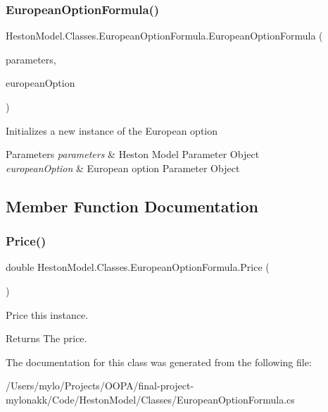 \subsubsection{\texorpdfstring{European\+Option\+Formula()}{EuropeanOptionFormula()}}
{\footnotesize\ttfamily Heston\+Model.\+Classes.\+European\+Option\+Formula.\+European\+Option\+Formula (\begin{DoxyParamCaption}\item[{\mbox{\hyperlink{class_heston_model_1_1_classes_1_1_interface_classes_1_1_heston_model_parameters}{Heston\+Model\+Parameters}}}]{parameters,  }\item[{\mbox{\hyperlink{class_heston_model_1_1_classes_1_1_interface_classes_1_1_european_option}{European\+Option}}}]{european\+Option }\end{DoxyParamCaption})\hspace{0.3cm}{\ttfamily [inline]}}



Initializes a new instance of the European option 


\begin{DoxyParams}{Parameters}
{\em parameters} & Heston Model Parameter Object\\
\hline
{\em european\+Option} & European option Parameter Object\\
\hline
\end{DoxyParams}


\subsection{Member Function Documentation}
\mbox{\label{class_heston_model_1_1_classes_1_1_european_option_formula_a25389e3e8b4d89daaa0b9b6af39f948c}} 
\subsubsection{\texorpdfstring{Price()}{Price()}}
{\footnotesize\ttfamily double Heston\+Model.\+Classes.\+European\+Option\+Formula.\+Price (\begin{DoxyParamCaption}{ }\end{DoxyParamCaption})\hspace{0.3cm}{\ttfamily [inline]}}



Price this instance. 

\begin{DoxyReturn}{Returns}
The price.
\end{DoxyReturn}


The documentation for this class was generated from the following file\+:\begin{DoxyCompactItemize}
\item 
/\+Users/mylo/\+Projects/\+O\+O\+P\+A/final-\/project-\/mylonakk/\+Code/\+Heston\+Model/\+Classes/European\+Option\+Formula.\+cs\end{DoxyCompactItemize}
